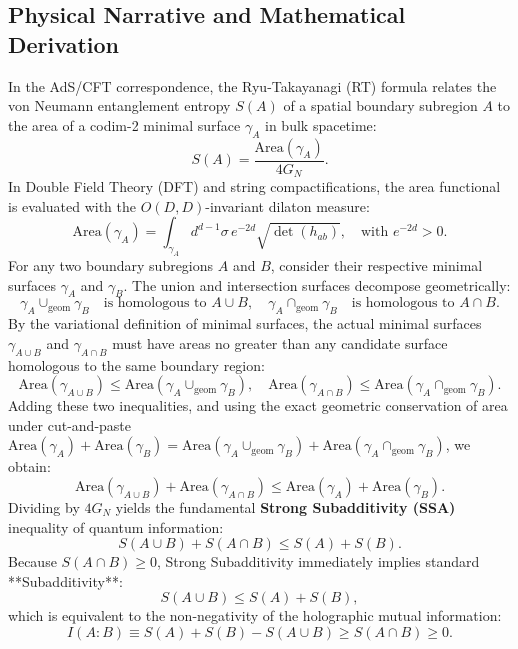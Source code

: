 \documentclass[11pt,a4paper]{article}
\begin{document}
\subsection{Physical Narrative and Mathematical Derivation}
In the AdS/CFT correspondence, the Ryu-Takayanagi (RT) formula relates the von Neumann entanglement entropy $S(A)$ of a spatial boundary subregion $A$ to the area of a codim-2 minimal surface $\gamma_A$ in bulk spacetime:
\begin{equation}
    S(A) = \frac{\mathrm{Area}(\gamma_A)}{4 G_N}.
\end{equation}
In Double Field Theory (DFT) and string compactifications, the area functional is evaluated with the $O(D,D)$-invariant dilaton measure:
\begin{equation}
    \mathrm{Area}(\gamma_A) = \int_{\gamma_A} d^{d-1}\sigma \, e^{-2d} \sqrt{\det(h_{ab})}, \quad \text{with } e^{-2d} > 0.
\end{equation}
For any two boundary subregions $A$ and $B$, consider their respective minimal surfaces $\gamma_A$ and $\gamma_B$. The union and intersection surfaces decompose geometrically:
\begin{equation}
    \gamma_A \cup_{\mathrm{geom}} \gamma_B \quad \text{is homologous to } A \cup B, \quad \gamma_A \cap_{\mathrm{geom}} \gamma_B \quad \text{is homologous to } A \cap B.
\end{equation}
By the variational definition of minimal surfaces, the actual minimal surfaces $\gamma_{A \cup B}$ and $\gamma_{A \cap B}$ must have areas no greater than any candidate surface homologous to the same boundary region:
\begin{equation}
    \mathrm{Area}(\gamma_{A \cup B}) \le \mathrm{Area}(\gamma_A \cup_{\mathrm{geom}} \gamma_B), \quad \mathrm{Area}(\gamma_{A \cap B}) \le \mathrm{Area}(\gamma_A \cap_{\mathrm{geom}} \gamma_B).
\end{equation}
Adding these two inequalities, and using the exact geometric conservation of area under cut-and-paste $\mathrm{Area}(\gamma_A) + \mathrm{Area}(\gamma_B) = \mathrm{Area}(\gamma_A \cup_{\mathrm{geom}} \gamma_B) + \mathrm{Area}(\gamma_A \cap_{\mathrm{geom}} \gamma_B)$, we obtain:
\begin{equation}
    \mathrm{Area}(\gamma_{A \cup B}) + \mathrm{Area}(\gamma_{A \cap B}) \le \mathrm{Area}(\gamma_A) + \mathrm{Area}(\gamma_B).
\end{equation}
Dividing by $4 G_N$ yields the fundamental \textbf{Strong Subadditivity (SSA)} inequality of quantum information:
\begin{equation}
    S(A \cup B) + S(A \cap B) \le S(A) + S(B).
\end{equation}
Because $S(A \cap B) \ge 0$, Strong Subadditivity immediately implies standard **Subadditivity**:
\begin{equation}
    S(A \cup B) \le S(A) + S(B),
\end{equation}
which is equivalent to the non-negativity of the holographic mutual information:
\begin{equation}
    I(A : B) \equiv S(A) + S(B) - S(A \cup B) \ge S(A \cap B) \ge 0.
\end{equation}
\end{document}
